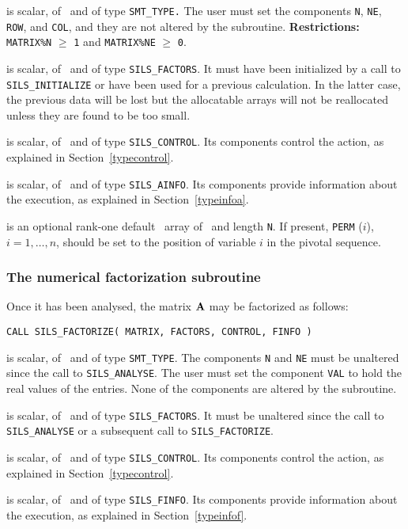 \documentclass{galahad}
\newcommand{\packagename}{SILS}
\begin{document}
\begin{description}
 is scalar, of \intentin\ and of type
{\tt SMT\_TYPE.}
The user must set the components {\tt N}, {\tt NE}, {\tt ROW},
and {\tt COL}, and they are not altered by the subroutine.
 {\bf Restrictions:}
 {\tt MATRIX\%N} $\geq$ {\tt 1} and {\tt MATRIX\%NE} $\geq$ {\tt 0}.

 is scalar, of \intentinout\ and of type
{\tt \packagename\_FACTORS}. It must have been initialized by a call to
{\tt \packagename\_INI\-TIALIZE} or have been used for a previous calculation.
In the latter case, the previous data will be lost but the allocatable
arrays will not be reallocated unless they are found to be too small.

 is scalar, of \intentin\ and of type
{\tt \packagename\_CONTROL}. Its components control the action, as explained in
Section~\ref{typecontrol}.

 is scalar, of \intentout\ and of type {\tt \packagename\_AINFO}.
Its components provide information about the execution, as explained in
Section~\ref{typeinfoa}.

 is an optional rank-one default \integer\ array of \intentin\
and length {\tt N}.
If present, {\tt PERM} ($i$), $i = 1, \ldots, n$, should be set
to the position of  variable $i$ in the pivotal sequence.

\end{description}


\subsubsection{The numerical factorization subroutine}
Once it has been analysed, the matrix ${\mathbf{A}}$ may be factorized as follows:

\hskip0.5in
{\tt CALL \packagename\_FACTORIZE( MATRIX, FACTORS, CONTROL, FINFO )}

\begin{description}

 is scalar, of \intentin\ and of type {\tt SMT\_TYPE}.  The
components {\tt N} and {\tt NE} must be unaltered since the call
to {\tt \packagename\_ANALYSE}. The user must set the component {\tt VAL}
to hold the real values of the entries. None of the components are altered
by the subroutine.

 is scalar, of \intentinout\ and of type
{\tt \packagename\_FACTORS}. It must be unaltered since the call
to {\tt \packagename\_ANALYSE} or a subsequent call to
{\tt \packagename\_FACTORIZE}.

 is scalar, of \intentin\ and of type
{\tt \packagename\_CONTROL}. Its components control the action, as explained in
Section~\ref{typecontrol}.

 is scalar, of \intentout\ and of type {\tt \packagename\_FINFO}.
Its components provide information about the execution, as explained in
Section~\ref{typeinfof}.

\end{description}
\end{document}
